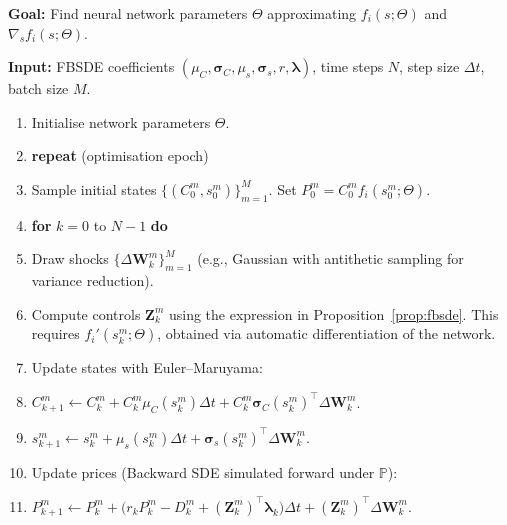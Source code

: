 ﻿\documentclass[11pt,letterpaper,oneside]{article}
\numberwithin{equation}{section}
\newcommand{\1}{\mathbf{1}}
\begin{document}
\begin{tcolorbox}[float, title={Algorithm 1: Deep BSDE Training Loop (Infinite-Horizon Adaptation)}, label={alg:deepbsde}]
\small
\textbf{Goal:} Find neural network parameters $\Theta$ approximating $f_i(s;\Theta)$ and $\nabla_s f_i(s;\Theta)$.

\textbf{Input:} FBSDE coefficients $(\mu_C,\bm{\sigma}_C,\mu_s,\bm{\sigma}_s,r,\bm{\lambda})$, time steps $N$, step size $\Delta t$, batch size $M$.

\begin{enumerate}[leftmargin=1.5em,itemsep=0.5em]

  \item Initialise network parameters $\Theta$.

  \item \textbf{repeat} (optimisation epoch)

    \item \quad Sample initial states $\{(C_0^m,s_0^m)\}_{m=1}^M$. Set $P_0^m = C_0^m f_i(s_0^m;\Theta)$.

  \item \quad \textbf{for} $k=0$ to $N-1$ \textbf{do}

    \item \quad\quad Draw shocks $\{\Delta\bm{W}_k^m\}_{m=1}^M$ (e.g., Gaussian with antithetic sampling for variance reduction).

    \item \quad\quad Compute controls $\bm{Z}_k^m$ using the expression in Proposition~\ref{prop:fbsde}. This requires $f_i'(s_k^m;\Theta)$, obtained via automatic differentiation of the network.

    \item \quad\quad Update states with Euler--Maruyama:

      \item \quad\quad\quad $C_{k+1}^m \leftarrow C_k^m + C_k^m \mu_C(s_k^m)\Delta t + C_k^m \bm{\sigma}_C(s_k^m)^{\top}\Delta\bm{W}_k^m$.

      \item \quad\quad\quad $s_{k+1}^m \leftarrow s_k^m + \mu_s(s_k^m)\Delta t + \bm{\sigma}_s(s_k^m)^{\top}\Delta\bm{W}_k^m$.

      \item \quad\quad Update prices (Backward SDE simulated forward under $\mathbb{P}$):

      \item \quad\quad\quad $P_{k+1}^m \leftarrow P_k^m + \big(r_k P_k^m - D_k^m + (\bm{Z}_k^m)^{\top}\bm{\lambda}_k\big)\Delta t + (\bm{Z}_k^m)^{\top}\Delta\bm{W}_k^m$.


\end{enumerate}
\end{tcolorbox}
\end{document}
